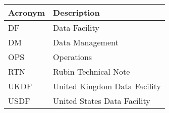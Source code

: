 \addtocounter{table}{-1}
\begin{longtable}{p{}p{}}\hline
\textbf{Acronym} & \textbf{Description}  \\\hline

DF & Data Facility \\\hline
DM & Data Management \\\hline
OPS & Operations \\\hline
RTN & Rubin Technical Note \\\hline
UKDF & United Kingdom Data Facility \\\hline
USDF & United States Data Facility \\\hline
\end{longtable}
